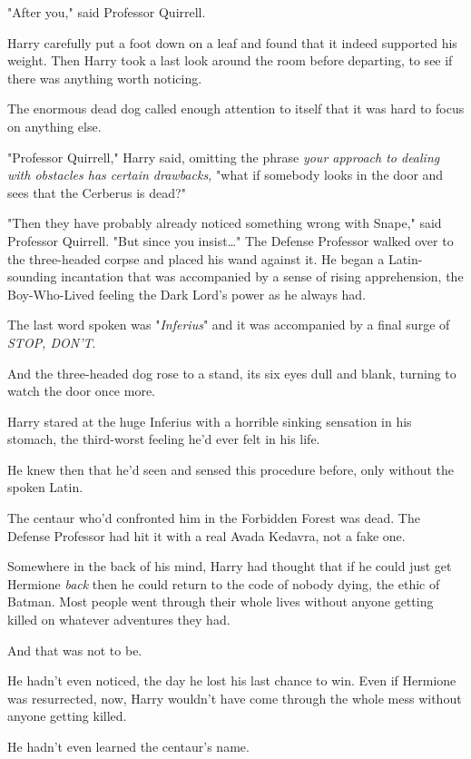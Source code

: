"After you," said Professor Quirrell.

Harry carefully put a foot down on a leaf and found that it indeed supported 
his weight. Then Harry took a last look around the room before departing, to 
see if there was anything worth noticing.

The enormous dead dog called enough attention to itself that it was hard to 
focus on anything else.

"Professor Quirrell," Harry said, omitting the phrase \emph{your approach to 
dealing with obstacles has certain drawbacks,} "what if somebody looks in the 
door and sees that the Cerberus is dead?"

"Then they have probably already noticed something wrong with Snape," said 
Professor Quirrell. "But since you insist{\ldots}" The Defense Professor walked 
over to the three-headed corpse and placed his wand against it. He began a 
Latin-sounding incantation that was accompanied by a sense of rising 
apprehension, the Boy-Who-Lived feeling the Dark Lord's power as he always had.

The last word spoken was "\emph{Inferius}" and it was accompanied by a final 
surge of \emph{STOP, DON'T}.

And the three-headed dog rose to a stand, its six eyes dull and blank, turning 
to watch the door once more.

Harry stared at the huge Inferius with a horrible sinking sensation in his 
stomach, the third-worst feeling he'd ever felt in his life.

He knew then that he'd seen and sensed this procedure before, only without the 
spoken Latin.

The centaur who'd confronted him in the Forbidden Forest was dead. The Defense 
Professor had hit it with a real Avada Kedavra, not a fake one.

Somewhere in the back of his mind, Harry had thought that if he could just get 
Hermione \emph{back} then he could return to the code of nobody dying, the 
ethic of Batman. Most people went through their whole lives without anyone 
getting killed on whatever adventures they had.

And that was not to be.

He hadn't even noticed, the day he lost his last chance to win. Even if 
Hermione was resurrected, now, Harry wouldn't have come through the whole mess 
without anyone getting killed.

He hadn't even learned the centaur's name.


